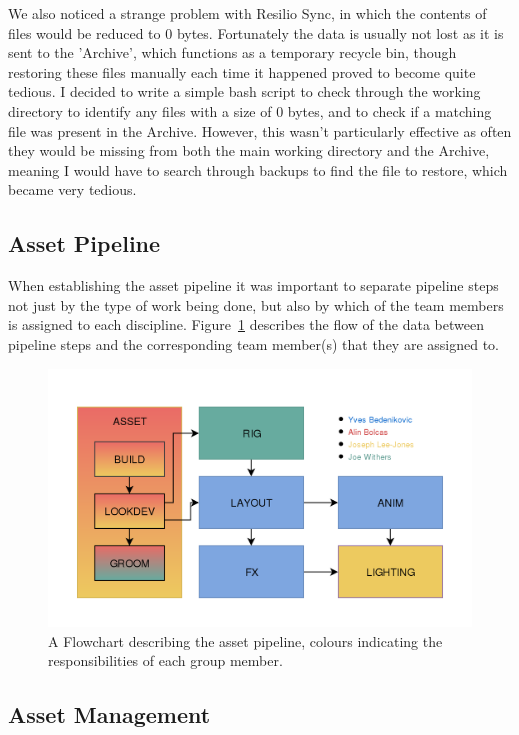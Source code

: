 \documentclass[11pt]{article}
\begin{document}
We also noticed a strange problem with Resilio Sync, in which the contents of files would be reduced to 0 bytes. Fortunately the data is usually not lost as it is sent to the 'Archive', which functions as a temporary recycle bin, though restoring these files manually each time it happened proved to become quite tedious. I decided to write a simple bash script to check through the working directory to identify any files with a size of 0 bytes, and to check if a matching file was present in the Archive. However, this wasn't particularly effective as often they would be missing from both the main working directory and the Archive, meaning I would have to search through backups to find the file to restore, which became very tedious.

\subsection{Asset Pipeline}

When establishing the asset pipeline it was important to separate pipeline steps not just by the type of work being done, but also by which of the team members is assigned to each discipline. Figure~\ref{figure:pipelineFlow} describes the flow of the data between pipeline steps and the corresponding team member(s) that they are assigned to.

\begin{figure}[htbp]\centering
	\includegraphics[width=1.0\linewidth]{images/pipeline.png}
	\caption{\label{figure:pipelineFlow} A Flowchart describing the asset pipeline, colours indicating the responsibilities of each group member.}
\end{figure}

\subsection{Asset Management} \label{assman}
\end{document}
